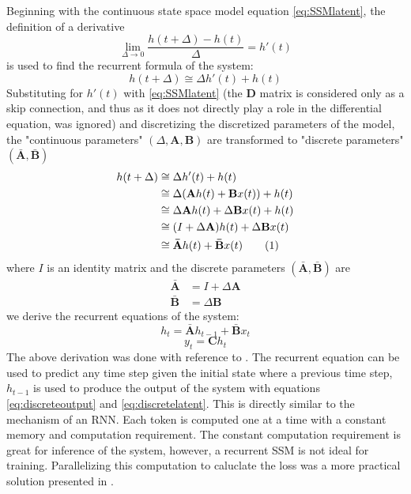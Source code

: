 \documentclass[conference]{IEEEtran}
\newcommand{\mbfb}[1]{\mathbf{\bar{{#1}}}}
\begin{document}
Beginning with the continuous state space model equation \eqref{eq:SSMlatent}, the definition of a derivative
\begin{equation*}
    \lim_{\Delta\to0} \frac{h(t+\Delta)-h(t)}{\Delta} = h'(t)
\end{equation*}
is used to find the recurrent formula of the system:
\begin{equation}
    h(t+\Delta) \cong \Delta h'(t) + h(t)
\end{equation}
Substituting for $h'(t)$ with \eqref{eq:SSMlatent} (the $\mathbf{D}$ matrix is considered only as a skip connection, and thus as it does not directly play a role in the differential equation, was ignored) and discretizing the discretized parameters of the model, the "continuous parameters" $(\Delta, \mathbf{A}, \mathbf{B})$ are transformed to "discrete parameters" $(\mbfb{A}, \mbfb{B})$
\newcommand\numberthis{\addtocounter{equation}{1}\tag{\theequation}}
\begin{align*}
    h(t+\Delta) & \cong \Delta h'(t) + h(t)                                              \\
                & \cong \Delta(\mathbf{A}h(t) + \mathbf{B}x(t)) + h(t)                   \\
                & \cong \Delta \mathbf{A}h(t) + \Delta \mathbf{B}x(t) + h(t)             \\
                & \cong (I + \Delta \mathbf{A})h(t) + \Delta \mathbf{B}x(t)              \\
                & \cong \mbfb{A}h(t) + \mbfb{B}x(t) \numberthis \label{eq:recurrentform}
\end{align*}
where $I$ is an identity matrix and the discrete parameters $(\mbfb{A}, \mbfb{B})$ are
\begin{align*}
    \mbfb{A} & = I + \Delta \mathbf{A} \\
    \mbfb{B} & = \Delta \mathbf{B}
\end{align*}
we derive the recurrent equations of the system:
\begin{equation}\label{eq:discretelatent}
    h_t = \mbfb{A}h_{t-1} + \mbfb{B}x_t
\end{equation}
\begin{equation}\label{eq:discreteoutput}
    y_t = \mathbf{C}h_t
\end{equation}
The above derivation was done with reference to \cite{mambaNotes}.
The recurrent equation can be used to predict any time step given the initial state where a previous time step, $h_{t-1}$ is used to produce the output of the system with equations \eqref{eq:discreteoutput} and \eqref{eq:discretelatent}. This is directly similar to the mechanism of an RNN. Each token is computed one at a time with a constant memory and computation requirement. The constant computation requirement is great for inference of the system, however, a recurrent SSM is not ideal for training. Parallelizing this computation to caluclate the loss was a more practical solution presented in \cite{gu2022efficiently}.
\end{document}
